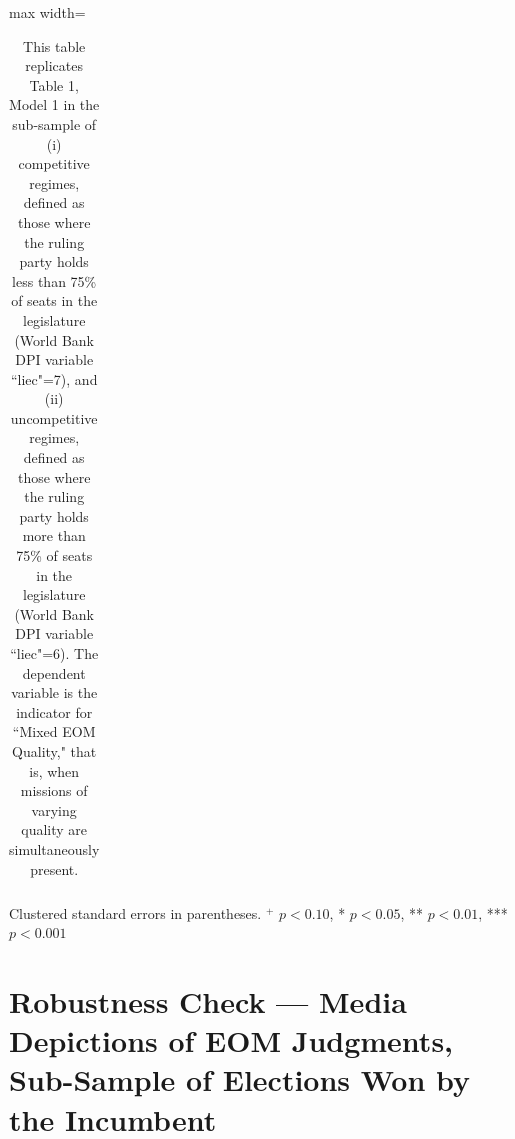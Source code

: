 \documentclass[USletter,12pt, titlepage]{article} %
\begin{document}
\begin{table}[H]
\begin{adjustbox}{max width=\textwidth}
\begin{threeparttable}
\begin{tabular}{lcc}
\bottomrule
\end{tabular}
\begin{tablenotes}
\small
\item Clustered standard errors in parentheses. $^{+}$ $p<0.10$, * $p<0.05$, ** $p<0.01$, *** $p<0.001$
\end{tablenotes}
\end{threeparttable}
\end{adjustbox}
\vspace{0.5em}
\caption{This table replicates Table 1, Model 1 in the sub-sample of (i) competitive regimes, defined as those where the ruling party holds less than 75\% of seats in the legislature (World Bank DPI variable ``liec"=7), and (ii) uncompetitive regimes, defined as those where the ruling party holds more than 75\% of seats in the legislature (World Bank DPI variable ``liec"=6). The dependent variable is the indicator for ``Mixed EOM Quality," that is, when missions of varying quality are simultaneously present.}
\end{table}

\section{Robustness Check --- Media Depictions of EOM Judgments, Sub-Sample of Elections Won by the Incumbent}
\end{document}
